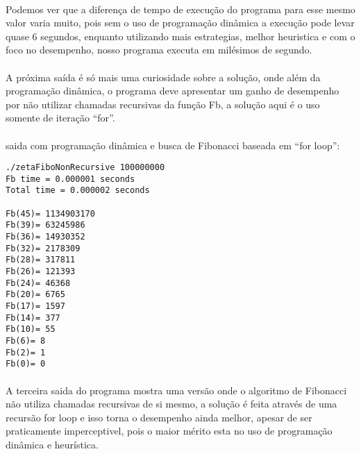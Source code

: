 \documentclass[10pt,a4paper]{article}
\begin{document}
{{	\paragraph{} Podemos ver que a diferença de tempo de execução do programa
	para esse mesmo valor varia muito, pois sem o uso de programação dinâmica
	a execução pode levar quase 6 segundos, enquanto utilizando mais estrategias,
	melhor heuristica e com o foco no desempenho, nosso programa executa em
	milésimos de segundo. 

	\paragraph{}A próxima saída é só mais uma curiosidade sobre a solução, onde
	além da programação dinâmica, o programa deve apresentar um ganho 
	de desempenho por não utilizar chamadas recursivas da função Fb, a solução aqui
	é o uso somente de iteração ``for''.


\paragraph{}saida com programação dinâmica e busca de Fibonacci baseada em ``for loop'':
	\begin{Verbatim}[frame=single,
				framesep=3mm,
				xrightmargin=3cm]
./zetaFiboNonRecursive 100000000
Fb time = 0.000001 seconds
Total time = 0.000002 seconds

Fb(45)= 1134903170 
Fb(39)= 63245986 
Fb(36)= 14930352 
Fb(32)= 2178309 
Fb(28)= 317811 
Fb(26)= 121393 
Fb(24)= 46368 
Fb(20)= 6765 
Fb(17)= 1597 
Fb(14)= 377 
Fb(10)= 55 
Fb(6)= 8 
Fb(2)= 1 
Fb(0)= 0 
\end{Verbatim}
	
	\paragraph{}
	A terceira saida do programa mostra uma versão
	onde o algoritmo de Fibonacci não utiliza chamadas recursivas de si mesmo,
	a solução é feita através de uma recursão for loop e isso torna o desempenho
	ainda melhor, apesar de ser praticamente imperceptivel, pois o maior
	mérito esta no uso de programação dinâmica e heurística.

}}
\end{document}

